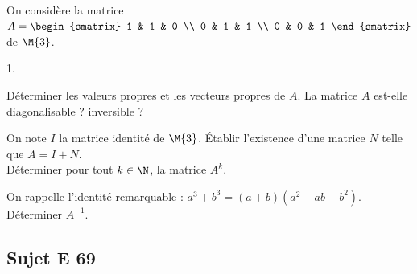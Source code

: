 \documentclass[11pt]{article}%
\begin{document}

\begin{exerciceSP}~\\
  On considère la matrice $A = 
  \begin{smatrix} 
    1 & 1 & 0 \\
    0 & 1 & 1 \\
    0 & 0 & 1
  \end{smatrix}$ de $\M{3}$.
  \begin{noliste}{1.}
    \setlength{\itemsep}{2mm}
  \item Déterminer les valeurs propres et les vecteurs propres de
    $A$. La matrice $A$ est-elle diagonalisable ? inversible ?
  \item On note $I$ la matrice identité de $\M{3}$. Établir
    l'existence d'une matrice $N$ telle que $A=I+N$.\\
    Déterminer pour tout $k\in\N$, la matrice $A^k$.
  \item On rappelle l'identité remarquable :
    $a^3+b^3=(a+b)(a^2-ab+b^2)$. Déterminer $A^{-1}$.
  \end{noliste}
\end{exerciceSP}


\newpage


\subsection*{Sujet E 69}

\end{document}
